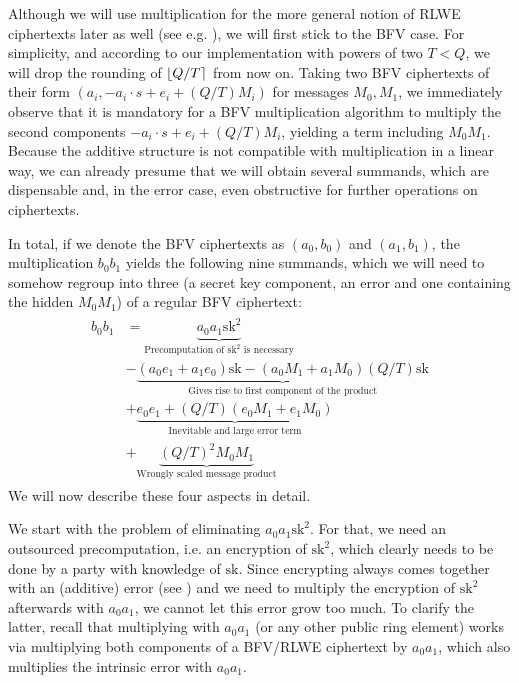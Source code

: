 \documentclass[letterpaper,10pt,english]{jupyterBook}
\begin{document}
\sphinxAtStartPar
Although we will use multiplication for the more general notion of RLWE ciphertexts later as well (see e.g. {\hyperref[\detokenize{Thesis:operations-on-rlwe-ciphertexts}]{}}), we will first stick to the BFV case.
For simplicity, and according to our implementation with powers of two \(T<Q\), we will drop the rounding of \(\left\lfloor Q/T \right\rceil\) from now on.
Taking two BFV ciphertexts of their form \((a_i,-a_i\cdot s + e_i + (Q/T) M_i)\) for messages \(M_0,M_1\), we immediately observe that it is mandatory for a BFV multiplication algorithm to multiply the second components \(-a_i\cdot s + e_i + (Q/T) M_i\), yielding a term including \(M_0M_1\).
Because the additive structure is not compatible with multiplication in a linear way, we can already presume that we will obtain several summands, which are dispensable and, in the error case, even obstructive for further operations on ciphertexts.

\sphinxAtStartPar
In total, if we denote the BFV ciphertexts as \((a_0,b_0)\) and \((a_1,b_1)\), the multiplication \(b_0b_1\) yields the following nine summands, which we will need to somehow regroup into three (a secret key component, an error and one containing the hidden \(M_0M_1\)) of a regular BFV ciphertext:
\begin{equation}\label{equation:Thesis:b-0b-1}
\begin{split}\begin{split}
b_0b_1 &= \underbrace{a_0a_1 \mathrm{sk}^2}_{\text{Precomputation of }\mathrm{sk}^2 \text{ is necessary}} \\
&- \underbrace{(a_0e_1+a_1e_0)\mathrm{sk} - (a_0M_1+a_1M_0)( Q/T)\mathrm{sk}}_{\text{Gives rise to first component of the product}} \\
&+ \underbrace{e_0e_1 + ( Q/T) (e_0M_1 +e_1M_0)}_{\text{Inevitable and large error term}} \\
&+ \underbrace{(Q/T)^2 M_0M_1}_{\text{Wrongly scaled message product}}
\end{split}\end{split}
\end{equation}
\sphinxAtStartPar
We will now describe these four aspects in detail.

\begin{DUlineblock}{0em}
\item[] 
\end{DUlineblock}

\sphinxAtStartPar
We start with the problem of eliminating \(a_0a_1\mathrm{sk}^2\).
For that, we need an outsourced precomputation, i.e. an encryption of \(\mathrm{sk}^2\), which clearly needs to be done by a party with knowledge of \(\mathrm{sk}\).
Since encrypting always comes together with an (additive) error (see {\hyperref[\detokenize{Thesis:error-after-BFV-encryption}]{}}) and we need to multiply the encryption of \(\mathrm{sk}^2\) afterwards with \(a_0a_1\), we cannot let this error grow too much.
To clarify the latter, recall that multiplying with \(a_0a_1\) (or any other public ring element) works via multiplying both components of a BFV/RLWE ciphertext by \(a_0a_1\), which also multiplies the intrinsic error with \(a_0a_1\).
\end{document}
